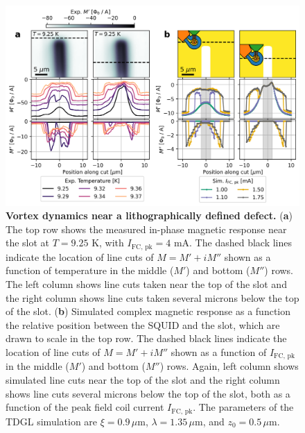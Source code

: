 \documentclass[%
 reprint,
 superscriptaddress,
 amsmath,
 amssymb,
 amsfonts,
 aps,
 prb,
]{revtex4-2}
\newcommand{\FC}{\mathrm{FC}}
\newcommand{\pk}{\mathrm{pk}}
\newcommand{\um}{\mu\mathrm{m}}
\begin{document}
\begin{figure}
    \centering
    \includegraphics[width=\linewidth]{figures/slot-sim-cuts.png}
    \caption{{\bf Vortex dynamics near a lithographically defined defect.} ({\bf a}) The top row shows the measured in-phase magnetic response near the slot at $T=9.25$ K, with $I_{\FC,\,\pk}=4$ mA. The dashed black lines indicate the location of line cuts of $M=M'+iM''$ shown as a function of temperature in the middle ($M'$) and bottom ($M''$) rows. The left column shows line cuts taken near the top of the slot and the right column shows line cuts taken several microns below the top of the slot. ({\bf b}) Simulated complex magnetic response as a function the relative position between the SQUID and the slot, which are drawn to scale in the top row. The dashed black lines indicate the location of line cuts of $M=M'+iM''$ shown as a function of $I_{\FC,\,\pk}$ in the middle ($M'$) and bottom ($M''$) rows. Again, left column shows simulated line cuts near the top of the slot and the right column shows line cuts several microns below the top of the slot, both as a function of the peak field coil current $I_{\FC,\,\pk}$. The parameters of the TDGL simulation are $\xi=0.9\,\um$, $\lambda=1.35\,\um$, and $z_0=0.5\,\um$.}
    \label{fig:squid-slot-cuts}
\end{figure}
\end{document}
